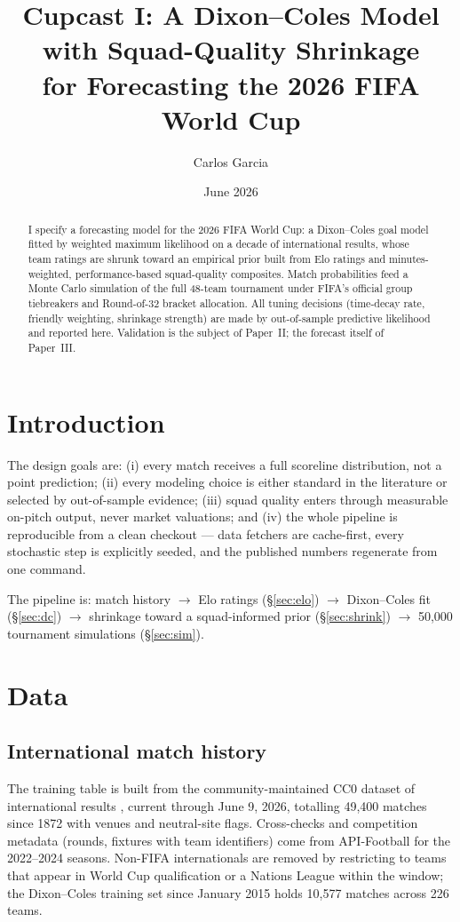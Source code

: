 \documentclass[11pt]{article}
\title{Cupcast I: A Dixon--Coles Model with Squad-Quality Shrinkage\\for Forecasting the 2026 FIFA World Cup}
\author{Carlos Garcia}
\date{June 2026}
\begin{document}
\maketitle

\begin{abstract}
I specify a forecasting model for the 2026 FIFA World Cup: a Dixon--Coles goal
model \cite{dixoncoles1997} fitted by weighted maximum likelihood on a decade of
international results, whose team ratings are shrunk toward an empirical prior
built from Elo ratings and minutes-weighted, performance-based squad-quality
composites. Match probabilities feed a Monte Carlo simulation of the full
48-team tournament under FIFA's official group tiebreakers and Round-of-32
bracket allocation. All tuning decisions (time-decay rate, friendly weighting,
shrinkage strength) are made by out-of-sample predictive likelihood and
reported here. Validation is the subject of Paper~II; the forecast itself of
Paper~III.
\end{abstract}

\section{Introduction}
The design goals are: (i) every match receives a full scoreline distribution,
not a point prediction; (ii) every modeling choice is either standard in the
literature or selected by out-of-sample evidence; (iii) squad quality enters
through measurable on-pitch output, never market valuations; and (iv) the whole
pipeline is reproducible from a clean checkout --- data fetchers are cache-first,
every stochastic step is explicitly seeded, and the published numbers regenerate
from one command.

The pipeline is: match history $\rightarrow$ Elo ratings (\S\ref{sec:elo})
$\rightarrow$ Dixon--Coles fit (\S\ref{sec:dc}) $\rightarrow$ shrinkage toward a
squad-informed prior (\S\ref{sec:shrink}) $\rightarrow$ 50{,}000 tournament
simulations (\S\ref{sec:sim}).

\section{Data}\label{sec:data}
\subsection{International match history}
The training table is built from the community-maintained CC0 dataset of
international results \cite{martj42}, current through June 9, 2026, totalling
49{,}400 matches since 1872 with venues and neutral-site flags. Cross-checks
and competition metadata (rounds, fixtures with team identifiers) come from
API-Football \cite{apifootball} for the 2022--2024 seasons. Non-FIFA
internationals are removed by restricting to teams that appear in World Cup
qualification or a Nations League within the window; the Dixon--Coles training
set since January 2015 holds 10{,}577 matches across 226 teams.
\end{document}
